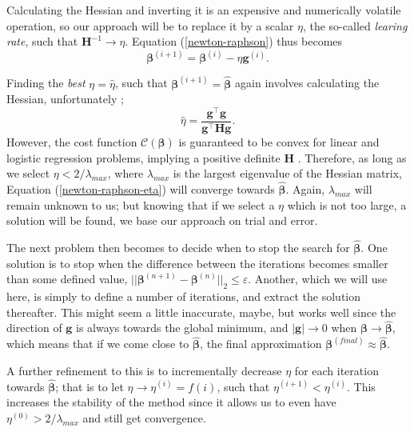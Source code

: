 \documentclass[]{article}
\begin{document}
Calculating the Hessian and inverting it is an expensive and numerically volatile operation, so our approach will be to replace it by a scalar $\eta$, the so-called \textit{learing rate}, such that $\mathbf{H}^{-1} \rightarrow \eta$. Equation (\ref{newton-raphson}) thus becomes
\begin{equation} \label{newton-raphson-eta}
	\mathbf{\beta}^{(i+1)} = \mathbf{\beta}^{(i)} - \eta \mathbf{g}^{(i)}.
\end{equation}

Finding the \textit{best} $\eta = \hat{\eta}$, such that $\mathbf{\beta}^{(i+1)} = \mathbf{\hat{\beta}}$ again involves calculating the Hessian, unfortunately \cite{fys-stk4155-notes}; 
\begin{equation}
	\hat{\eta} = \frac{\mathbf{g}^\intercal \mathbf{g}}{\mathbf{g}^\intercal \mathbf{H} \mathbf{g}}.
\end{equation}
However, the cost function $\mathcal{C}(\mathbf{\beta})$ is guaranteed to be convex for linear and logistic regression problems, implying a positive definite $\mathbf{H}$ \cite{murphy2012machine}. Therefore, as long as we select $\eta < 2/\lambda_{max}$, where $\lambda_{max}$ is the largest eigenvalue of the Hessian matrix, Equation (\ref{newton-raphson-eta}) will converge towards $\mathbf{\hat{\beta}}$. Again, $\lambda_{max}$ will remain unknown to us; but knowing that if we select a $\eta$ which is not too large, a solution will be found, we base our approach on trial and error. 

\vspace{5mm}

The next problem then becomes to decide when to stop the search for $\mathbf{\hat{\beta}}$. One solution is to stop when the difference between the iterations becomes smaller than some defined value, $||\mathbf{\beta}^{(n+1)} - \mathbf{\beta}^{(n)}||_2 \le \varepsilon$. Another, which we will use here, is simply to define a number of iterations, and extract the solution thereafter. This might seem a little inaccurate, maybe, but works well since the direction of $\mathbf{g}$ is always towards the global minimum, and $|\mathbf{g}| \rightarrow 0$ when $\mathbf{\beta} \rightarrow \mathbf{\hat{\beta}}$, which means that if we come close to $\mathbf{\hat{\beta}}$, the final approximation $\mathbf{\beta}^{(final)} \approx \mathbf{\hat{\beta}}$.

A further refinement to this is to incrementally decrease $\eta$ for each iteration towards $\mathbf{\hat{\beta}}$; that is to let $\eta \rightarrow \eta^{(i)} = f(i)$, such that $\eta^{(i+1)} < \eta^{(i)}$. This increases the stability of the method since it allows us to even have $\eta^{(0)} > 2/\lambda_{max}$ and still get convergence.
\end{document}
